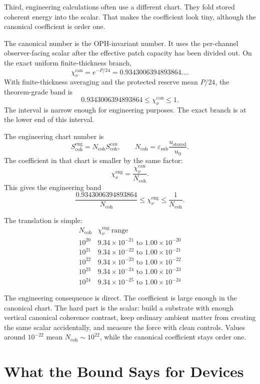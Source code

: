 \documentclass[11pt]{article}
\numberwithin{equation}{section}
\theoremstyle{remark}
\newcommand{\chican}{\chi_\nu^{\mathrm{can}}}
\newcommand{\chieng}{\chi_\nu^{\mathrm{eng}}}
\newcommand{\scohcan}{S_{\mathrm{coh}}^{\mathrm{can}}}
\newcommand{\scoheng}{S_{\mathrm{coh}}^{\mathrm{eng}}}
\newcommand{\Ncoh}{N_{\mathrm{coh}}}
\newcommand{\eps}{\varepsilon}
\begin{document}
Third, engineering calculations often use a different chart. They fold stored
coherent energy into the scalar. That makes the coefficient look tiny, although
the canonical coefficient is order one.

The canonical number is the OPH-invariant number. It uses the per-channel
observer-facing scalar after the effective patch capacity has been divided out.
On the exact uniform finite-thickness branch,
\[
\chican=e^{-P/24}=0.9343006394893864\ldots .
\]
With finite-thickness averaging and the protected reserve mean \(P/24\), the
theorem-grade band is
\[
\boxed{
0.9343006394893864
\le
\chican
\le
1.
}
\]
The interval is narrow enough for engineering purposes. The exact branch is at
the lower end of this interval.

The engineering chart number is
\[
\scoheng=\Ncoh\scohcan,
\qquad
\Ncoh=\eps_{\mathrm{sub}}\frac{u_{\mathrm{stored}}}{u_0}.
\]
The coefficient in that chart is smaller by the same factor:
\[
\boxed{
\chieng=\frac{\chican}{\Ncoh}.
}
\]
This gives the engineering band
\[
\boxed{
\frac{0.9343006394893864}{\Ncoh}
\le
\chieng
\le
\frac{1}{\Ncoh}.
}
\]

The translation is simple:
\[
\begin{array}{c|c}
\Ncoh & \chieng\ \mathrm{range}\\
\hline
10^{20} & 9.34\times10^{-21}\text{ to }1.00\times10^{-20}\\
10^{21} & 9.34\times10^{-22}\text{ to }1.00\times10^{-21}\\
10^{22} & 9.34\times10^{-23}\text{ to }1.00\times10^{-22}\\
10^{23} & 9.34\times10^{-24}\text{ to }1.00\times10^{-23}\\
10^{24} & 9.34\times10^{-25}\text{ to }1.00\times10^{-24}
\end{array}
\]

The engineering consequence is direct. The coefficient is large enough in the
canonical chart. The hard part is the scalar: build a substrate with enough
vertical canonical coherence contrast, keep ordinary ambient matter from
creating the same scalar accidentally, and measure the force with clean
controls. Values around \(10^{-22}\) mean \(\Ncoh\sim10^{22}\), while the
canonical coefficient stays order one.

\section{What the Bound Says for Devices}
\end{document}
